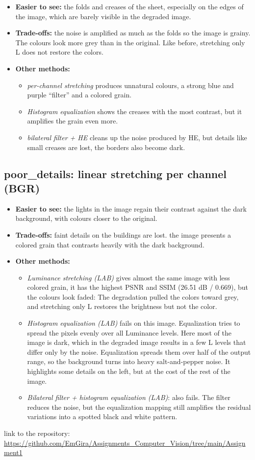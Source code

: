 \documentclass[11pt,a4paper]{article}
\begin{document}
\begin{itemize}
  \item \textbf{Easier to see:} the folds and creases of the sheet, especially on the edges of the image, which are barely visible in the degraded image.
  \item \textbf{Trade-offs:} the noise is amplified as much as the folds so the image is grainy. The colours look more grey than in the original. Like before, stretching only L does not restore the colors.
  \item \textbf{Other methods:}
  \begin{itemize}
    \item \emph{per-channel stretching} produces unnatural colours, a strong blue and purple ``filter'' and a colored grain.
    \item \emph{Histogram equalization} shows the creases with the most contrast, but it amplifies the grain even more.
    \item \emph{bilateral filter + HE} cleans up the noise produced by HE, but details like small creases are lost, the borders also become dark.
  \end{itemize}
\end{itemize}

\subsection{poor\_details: linear stretching per channel (BGR)}

\begin{itemize}
  \item \textbf{Easier to see:} the lights in the image regain their contrast against the dark background, with colours closer to the original.
  \item \textbf{Trade-offs:} faint details on the buildings are lost. the image presents a colored grain that contrasts heavily with the dark background.
  \item \textbf{Other methods:}
  \begin{itemize}
    \item \emph{Luminance stretching (LAB)} gives almost the same image with less colored grain, it has the highest PSNR and SSIM (26.51 dB / 0.669), but the colours look faded: The degradation pulled the colors toward grey, and stretching only L restores the brightness but not the color.
    \item \emph{Histogram equalization (LAB)} fails on this image. Equalization tries to spread the pixels evenly over all Luminance levels. Here most of the image is dark, which in the degraded image results in a few L levels that differ only by the noise. Equalization spreads them over half of the output range, so the background turns into heavy salt-and-pepper noise. It highlights some details on the left, but at the cost of the rest of the image.
    \item \emph{Bilateral filter + histogram equalization (LAB)}: also fails. The filter reduces the noise, but the equalization mapping still amplifies the residual variations into a spotted black and white pattern.
  \end{itemize}
\end{itemize}

\vspace{1em}
link to the repository: \url{https://github.com/EmGira/Assignments_Computer_Vision/tree/main/Assignment1}
\end{document}
